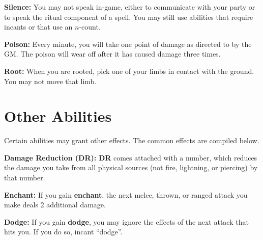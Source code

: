 \documentclass[green]{grimrock}
\begin{document}
{\bf Silence:} You may not speak in-game, either to communicate with your party or to speak the ritual component of a spell.  You may still use abilities that require incants or that use an $n$-count.

{\bf Poison:}  Every minute, you will take one point of damage as directed to by the GM.  The poison will wear off after it has caused damage three times.

{\bf Root:} When you are rooted, pick one of your  limbs in contact with the ground.  You may not move that limb.

\section{Other Abilities}

Certain abilities may grant other effects.  The common effects are compiled below.

{\bf Damage Reduction (DR):} {\bf DR} comes attached with a number, which reduces the damage you take from all physical sources (not fire, lightning, or piercing) by that number.

{\bf Enchant:} If you gain {\bf enchant}, the next melee, thrown, or ranged attack you make deals 2 additional damage.

{\bf Dodge:} If you gain {\bf dodge}, you may ignore the effects of the next attack that hits you.  If you do so, incant ``dodge''. 



\end{document}
